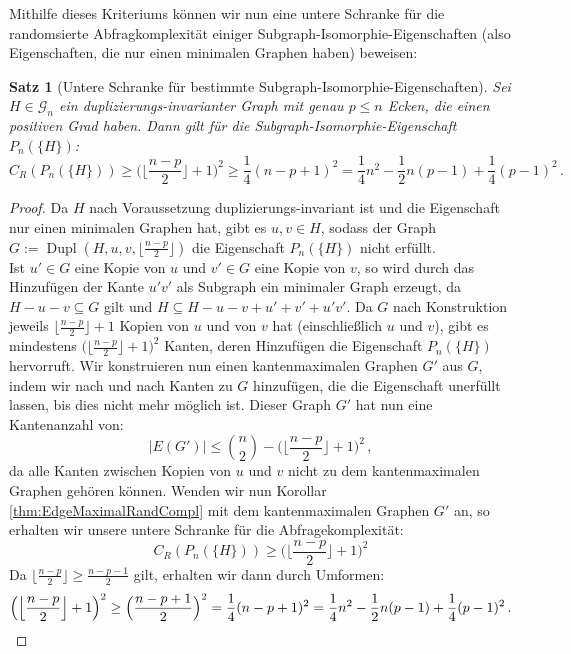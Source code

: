 \documentclass[10pt,a4paper, footheight=1mm]{scrreprt}
\newtheorem{Satz}[definition]{Satz}
\theoremstyle{definition}
\DeclareMathOperator\Dupl{Dupl}
\begin{document}
Mithilfe dieses Kriteriums können wir nun eine
untere Schranke für die randomsierte Abfragkomplexität
einiger Subgraph-Isomorphie-Eigenschaften (also Eigenschaften,
die nur einen minimalen Graphen haben) beweisen:
\begin{Satz}
[Untere Schranke für bestimmte Subgraph-Isomorphie-Eigenschaften]
\label{thm:SubgraphIsomorphismLowerBound}
Sei $H\in \mathcal{G}_n$ ein duplizierungs-invarianter Graph
mit genau $p\leq n$ Ecken, die einen positiven Grad haben.
Dann gilt für die Subgraph-Isomorphie-Eigenschaft $P_n(\{H\})$:
$$ C_R(P_n(\{H\})) \geq 
\Big ( \Big \lfloor  \frac{n-p}{2} \Big \rfloor + 1 \Big)^{2} \geq
\frac{1}{4}(n-p+1)^2 =
\frac{1}{4}n^2 - \frac{1}{2}n(p-1) + \frac{1}{4}(p-1)^2\,.
$$
\end{Satz}
\begin{proof}
Da $H$ nach Voraussetzung duplizierungs-invariant ist und die 
Eigenschaft nur einen minimalen Graphen hat, gibt es
$u,v \in H$, sodass der Graph 
$G:= \Dupl(H, u, v, \big \lfloor \frac{n-p}{2} \big \rfloor)$
die Eigenschaft $P_n(\{H\})$ nicht erfüllt. \\
Ist $u'\in G$ eine Kopie von $u$ und $v' \in G$ eine Kopie von $v$,
so wird durch das Hinzufügen der Kante $u'v'$ als Subgraph ein
minimaler Graph erzeugt, da $H-u-v \subseteq G$ gilt und
$H \subseteq H-u-v + u' + v' + u'v'$. Da $G$ nach Konstruktion
jeweils $\big \lfloor \frac{n-p}{2} \big \rfloor+1$ Kopien von
$u$  und von $v$ hat (einschließlich $u$ und $v$), gibt es mindestens
$\Big( \Big \lfloor  \frac{n-p}{2} \Big \rfloor + 1 \Big)^{2}$
Kanten, deren Hinzufügen die Eigenschaft $P_n(\{H\})$ hervorruft.
Wir konstruieren nun einen kantenmaximalen Graphen $G'$ aus
$G$, indem wir nach und nach Kanten zu $G$ hinzufügen, die die
Eigenschaft unerfüllt lassen, bis dies nicht mehr möglich ist.
Dieser Graph $G'$ hat nun eine Kantenanzahl von:
$$ |E(G')| \leq \binom{n}{2} - 
\Big ( \Big \lfloor  \frac{n-p}{2} \Big \rfloor + 1 \Big)^{2}\,,$$
da alle Kanten zwischen Kopien von $u$ und $v$ nicht zu dem
kantenmaximalen Graphen gehören können. Wenden wir nun
Korollar \ref{thm:EdgeMaximalRandCompl} mit dem kantenmaximalen
Graphen $G'$ an, so erhalten wir unsere untere Schranke für
die Abfragekomplexität:
$$ C_R(P_n(\{H\})) \geq 
\Big (  \Big \lfloor  \frac{n-p}{2} \Big \rfloor + 1 \Big )^2$$
Da $\Big \lfloor  \frac{n-p}{2} \Big \rfloor \geq \frac{n-p-1}{2}$
gilt, erhalten wir dann durch Umformen:
\begin{equation*}
\Big ( \Big \lfloor  \frac{n-p}{2} \Big \rfloor + 1 \Big)^{2} \geq
\Big ( \frac{n-p+1}{2} \Big ) ^2 =
\frac{1}{4}(n-p+1)^2 =
\frac{1}{4}n^2 - \frac{1}{2}n(p-1) + \frac{1}{4}(p-1)^2\,. \qedhere
\end{equation*}
\end{proof}
\end{document}
